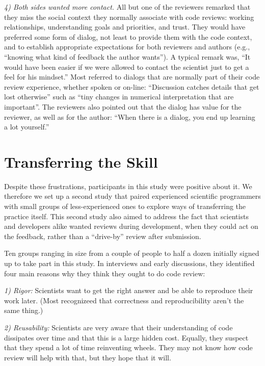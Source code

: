 \documentclass[10pt,twocolumn]{article}
\begin{document}
\noindent \emph{4) Both sides wanted more contact.}
All but one of the reviewers remarked that they miss the social context they normally associate with code reviews:
working relationships, understanding goals and priorities, and trust.
They would have preferred some form of dialog,
not least to provide them with the code context,
and to establish appropriate expectations for both reviewers and authors
(e.g., ``knowing what kind of feedback the author wants'').
A typical remark was,
``It would have been easier if we were allowed to contact the scientist just to get a feel for his mindset.''
Most referred to dialogs that are normally part of their code review experience,
whether spoken or on-line:
``Discussion catches details that get lost otherwise''
such as ``tiny changes in numerical interpretation that are important''.
The reviewers also pointed out that the dialog has value for the reviewer,
as well as for the author:
``When there is a dialog, you end up learning a lot yourself.''

\section{Transferring the Skill}

Despite these frustrations,
participants in this study were positive about it.
We therefore we set up a second study
that paired experienced scientific programmers with small groups of less-experienced ones
to explore ways of transferring the practice itself.
This second study also aimed to address the fact that
scientists and developers alike wanted reviews during development,
when they could act on the feedback,
rather than a ``drive-by'' review after submission.

Ten groups ranging in size from a couple of people to half a dozen initially signed up to take part in this study.
In interviews and early discussions,
they identified four main reasons why they think they ought to do code review:

\noindent \emph{1) Rigor:}
Scientists want to get the right answer and be able to reproduce their work later.
(Most recognizeed that correctness and reproducibility aren't the same thing.)

\noindent \emph{2) Reusability:}
Scientists are very aware that their understanding of code dissipates over time
and that this is a large hidden cost.
Equally, they suspect that they spend a lot of time reinventing wheels.
They may not know how code review will help with that, but they hope that it will.
\end{document}
